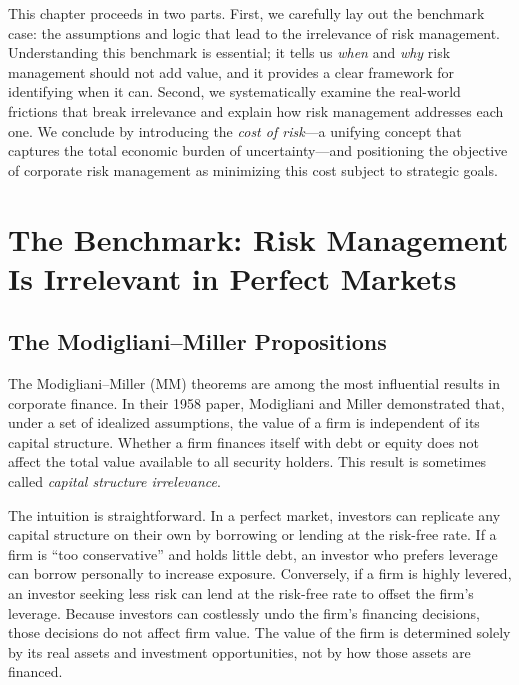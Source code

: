 \documentclass[11pt,openany]{book}
\begin{document}
This chapter proceeds in two parts. First, we carefully lay out the benchmark case: the assumptions and logic that lead to the irrelevance of risk management. Understanding this benchmark is essential; it tells us \emph{when} and \emph{why} risk management should not add value, and it provides a clear framework for identifying when it can. Second, we systematically examine the real-world frictions that break irrelevance and explain how risk management addresses each one. We conclude by introducing the \emph{cost of risk}---a unifying concept that captures the total economic burden of uncertainty---and positioning the objective of corporate risk management as minimizing this cost subject to strategic goals.


\section{The Benchmark: Risk Management Is Irrelevant in Perfect Markets}\label{the-benchmark-risk-management-is-irrelevant-in-perfect-markets}

\subsection{The Modigliani--Miller Propositions}\label{the-modiglianimiller-propositions}

The Modigliani--Miller (MM) theorems are among the most influential results in corporate finance. In their 1958 paper, Modigliani and Miller demonstrated that, under a set of idealized assumptions, the value of a firm is independent of its capital structure. Whether a firm finances itself with debt or equity does not affect the total value available to all security holders. This result is sometimes called \emph{capital structure irrelevance}.

The intuition is straightforward. In a perfect market, investors can replicate any capital structure on their own by borrowing or lending at the risk-free rate. If a firm is ``too conservative'' and holds little debt, an investor who prefers leverage can borrow personally to increase exposure. Conversely, if a firm is highly levered, an investor seeking less risk can lend at the risk-free rate to offset the firm's leverage. Because investors can costlessly undo the firm's financing decisions, those decisions do not affect firm value. The value of the firm is determined solely by its real assets and investment opportunities, not by how those assets are financed.
\end{document}
